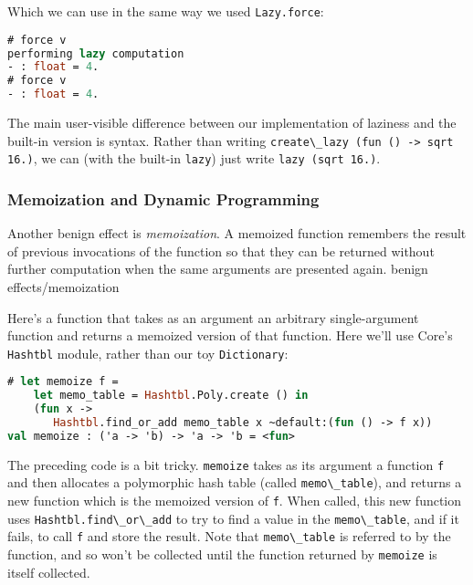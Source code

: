 Which we can use in the same way we used
\passthrough{\lstinline!Lazy.force!}:

\begin{lstlisting}[language=Caml]
# force v
performing lazy computation
- : float = 4.
# force v
- : float = 4.
\end{lstlisting}

The main user-visible difference between our implementation of laziness
and the built-in version is syntax. Rather than writing
\passthrough{\lstinline!create\_lazy (fun () -> sqrt 16.)!}, we can
(with the built-in \passthrough{\lstinline!lazy!}) just write
\passthrough{\lstinline!lazy (sqrt 16.)!}.

\hypertarget{memoization-and-dynamic-programming}{%
\subsubsection{Memoization and Dynamic
Programming}\label{memoization-and-dynamic-programming}}

Another benign effect is \emph{memoization}. A memoized function
remembers the result of previous invocations of the function so that
they can be returned without further computation when the same arguments
are presented again.
\protect\hypertarget{BEmem}{}{benign
effects/memoization}

Here's a function that takes as an argument an arbitrary single-argument
function and returns a memoized version of that function. Here we'll use
Core's \passthrough{\lstinline!Hashtbl!} module, rather than our toy
\passthrough{\lstinline!Dictionary!}:

\begin{lstlisting}[language=Caml]
# let memoize f =
    let memo_table = Hashtbl.Poly.create () in
    (fun x ->
       Hashtbl.find_or_add memo_table x ~default:(fun () -> f x))
val memoize : ('a -> 'b) -> 'a -> 'b = <fun>
\end{lstlisting}

The preceding code is a bit tricky. \passthrough{\lstinline!memoize!}
takes as its argument a function \passthrough{\lstinline!f!} and then
allocates a polymorphic hash table (called
\passthrough{\lstinline!memo\_table!}), and returns a new function which
is the memoized version of \passthrough{\lstinline!f!}. When called,
this new function uses \passthrough{\lstinline!Hashtbl.find\_or\_add!}
to try to find a value in the \passthrough{\lstinline!memo\_table!}, and
if it fails, to call \passthrough{\lstinline!f!} and store the result.
Note that \passthrough{\lstinline!memo\_table!} is referred to by the
function, and so won't be collected until the function returned by
\passthrough{\lstinline!memoize!} is itself collected.

